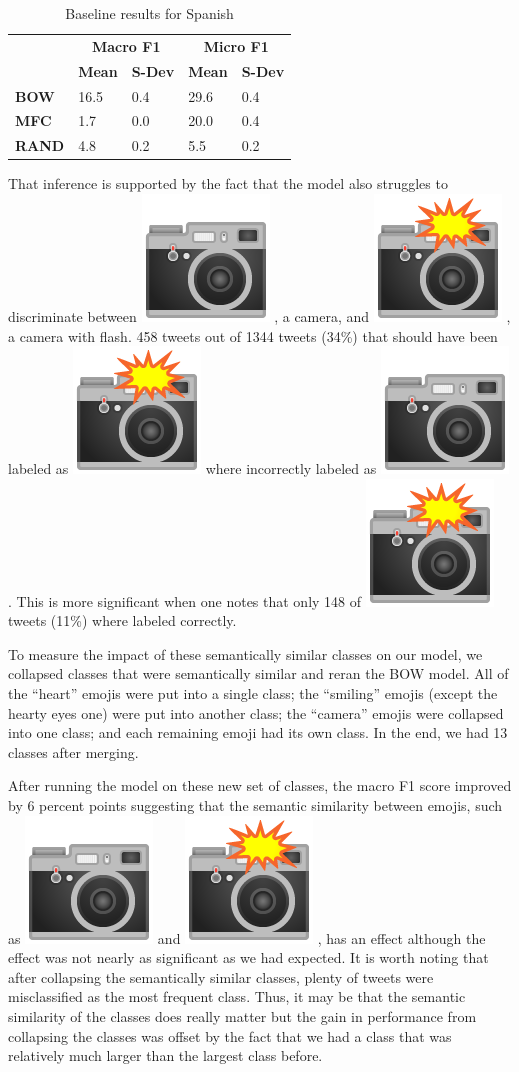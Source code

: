 \documentclass[11pt,a4paper]{article}
\newcommand{\camera}{%
  \begingroup\normalfont
  \includegraphics[height=\fontcharht\font`\B]{emojis/emoji_u1f4f7.png}%
  \endgroup
  \space
}
\newcommand{\cameraflash}{%
  \begingroup\normalfont
  \includegraphics[height=\fontcharht\font`\B]{emojis/emoji_u1f4f8.png}%
  \endgroup
  \space
}
\begin{document}
\begin{table}[]
\centering

\begin{tabular}{l|l|l|l|l|}
\cline{2-5}
                                    & \multicolumn{2}{c|}{\textbf{Macro F1}} & \multicolumn{2}{c|}{\textbf{Micro F1}} \\ \cline{2-5} 
                                    & \textbf{Mean}     & \textbf{S-Dev}     & \textbf{Mean}     & \textbf{S-Dev}     \\ \hline
\multicolumn{1}{|l|}{\textbf{BOW}}  & 16.5              & 0.4                & 29.6                & 0.4                 \\
\multicolumn{1}{|l|}{\textbf{MFC}}  & 1.7               & 0.0                  & 20.0                & 0.4                 \\
\multicolumn{1}{|l|}{\textbf{RAND}} & 4.8               & 0.2                & 5.5                & 0.2                 \\ \hline
\end{tabular}
\caption{Baseline results for Spanish}
\label{table:baseline-es}
\end{table}

That inference is supported by the fact that the model also struggles to discriminate between \camera, a camera, and \cameraflash, a camera with flash. 458 tweets out of 1344 tweets (34\%) that should have been labeled as \cameraflash where incorrectly labeled as \camera. This is more significant when one notes that only 148 of \cameraflash tweets (11\%) where labeled correctly. 

To measure the impact of these semantically similar classes on our model, we collapsed classes that were semantically similar and reran the BOW model. All of the ``heart'' emojis were put into a single class; the ``smiling'' emojis (except the hearty eyes one) were put into another class; the ``camera'' emojis were collapsed into one class; and each remaining emoji had its own class. In the end, we had 13 classes after merging.

After running the model on these new set of classes, the macro F1 score improved by 6 percent points suggesting that the semantic similarity between emojis, such as \camera and \cameraflash, has an effect although the effect was not nearly as significant as we had expected. It is worth noting that after collapsing the semantically similar classes, plenty of tweets were misclassified as the most frequent class. Thus, it may be that the semantic similarity of the classes does really matter but the gain in performance from collapsing the classes was offset by the fact that we had a class that was relatively much larger than the largest class before.
\end{document}
